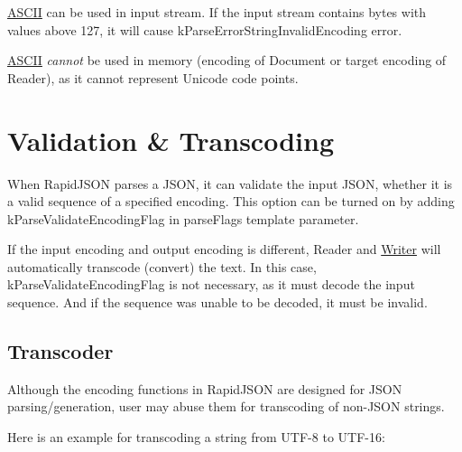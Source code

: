 \hyperlink{struct_a_s_c_i_i}{A\+S\+C\+II} can be used in input stream. If the input stream contains bytes with values above 127, it will cause {\ttfamily k\+Parse\+Error\+String\+Invalid\+Encoding} error.

\hyperlink{struct_a_s_c_i_i}{A\+S\+C\+II} {\itshape cannot} be used in memory (encoding of {\ttfamily Document} or target encoding of {\ttfamily Reader}), as it cannot represent Unicode code points.\hypertarget{md_Cadriciel_Commun_Externe_RapidJSON_doc_encoding.zh-cn_ValidationTranscoding}{}\section{Validation \& Transcoding}\label{md_Cadriciel_Commun_Externe_RapidJSON_doc_encoding.zh-cn_ValidationTranscoding}
When Rapid\+J\+S\+ON parses a J\+S\+ON, it can validate the input J\+S\+ON, whether it is a valid sequence of a specified encoding. This option can be turned on by adding {\ttfamily k\+Parse\+Validate\+Encoding\+Flag} in {\ttfamily parse\+Flags} template parameter.

If the input encoding and output encoding is different, {\ttfamily Reader} and {\ttfamily \hyperlink{class_writer}{Writer}} will automatically transcode (convert) the text. In this case, {\ttfamily k\+Parse\+Validate\+Encoding\+Flag} is not necessary, as it must decode the input sequence. And if the sequence was unable to be decoded, it must be invalid.\hypertarget{md_Cadriciel_Commun_Externe_RapidJSON_doc_encoding.zh-cn_Transcoder}{}\subsection{Transcoder}\label{md_Cadriciel_Commun_Externe_RapidJSON_doc_encoding.zh-cn_Transcoder}
Although the encoding functions in Rapid\+J\+S\+ON are designed for J\+S\+ON parsing/generation, user may abuse them for transcoding of non-\/\+J\+S\+ON strings.

Here is an example for transcoding a string from U\+T\+F-\/8 to U\+T\+F-\/16\+:


